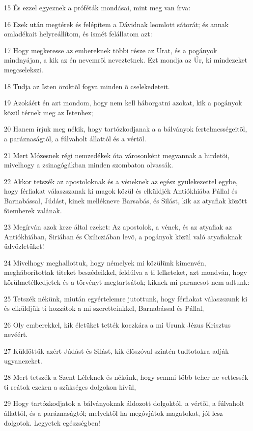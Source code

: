 \par 15 És ezzel egyeznek a próféták mondásai, mint meg van írva:
\par 16 Ezek után megtérek és felépítem a Dávidnak leomlott sátorát; és annak omladékait helyreállítom, és ismét felállatom azt:
\par 17 Hogy megkeresse az embereknek többi része az Urat, és a pogányok mindnyájan, a kik az én nevemrõl neveztetnek. Ezt mondja az Úr, ki mindezeket megcselekszi.
\par 18 Tudja az Isten öröktõl fogva minden õ cselekedeteit.
\par 19 Azokáért én azt mondom, hogy nem kell háborgatni azokat, kik a pogányok közül térnek meg az Istenhez;
\par 20 Hanem írjuk meg nékik, hogy tartózkodjanak a a bálványok fertelmességeitõl, a paráznaságtól, a  fúlvaholt állattól és a  vértõl.
\par 21 Mert Mózesnek régi nemzedékek óta városonként megvannak a hirdetõi, mivelhogy a zsinagógákban minden szombaton olvassák.
\par 22 Akkor tetszék az apostoloknak és a véneknek az egész gyülekezettel egybe, hogy férfiakat válaszszanak ki magok közül és elküldjék Antiókhiába Pállal és Barnabással, Júdást, kinek mellékneve Barsabás, és Silást, kik az atyafiak között fõemberek valának.
\par 23 Megírván azok keze által ezeket: Az apostolok, a vének, és az atyafiak az Antiókhiában, Siriában és Czilicziában levõ, a pogányok közül való atyafiaknak üdvözletüket!
\par 24 Mivelhogy meghallottuk, hogy némelyek mi közülünk kimenvén, megháborítottak titeket beszédeikkel, feldúlva a ti lelketeket, azt mondván, hogy körülmetélkedjetek és a törvényt megtartsátok; kiknek mi parancsot nem adtunk:
\par 25 Tetszék nékünk, miután egyértelemre jutottunk, hogy férfiakat válaszszunk ki és elküldjük ti hozzátok a mi szeretteinkkel, Barnabással és Pállal,
\par 26 Oly emberekkel, kik életüket tették koczkára a mi Urunk Jézus Krisztus nevéért.
\par 27 Küldöttük azért Júdást és Silást, kik élõszóval szintén tudtotokra adják ugyanezeket.
\par 28 Mert tetszék a Szent Léleknek és nékünk, hogy semmi több teher ne vettessék ti reátok ezeken a szükséges dolgokon kívül,
\par 29 Hogy tartózkodjatok a bálványoknak áldozott dolgoktól, a vértõl, a fúlvaholt állattól, és a paráznaságtól; melyektõl ha megóvjátok magatokat, jól lesz dolgotok. Legyetek egészségben!
